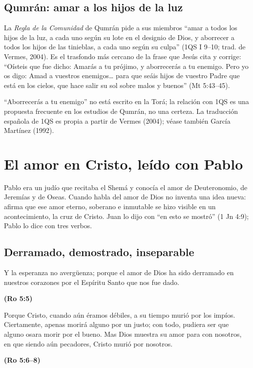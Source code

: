 \documentclass[11pt,letterpaper]{article}
\newcommand{\fuente}[1]{\par\hfill{\upshape\bfseries\small\textcolor{azul}{#1}}}
\begin{document}
\subsection{Qumrán: amar a los hijos de la luz}
La \emph{Regla de la Comunidad} de Qumrán pide a sus miembros ``amar a todos los hijos de la luz, a cada uno según su lote en el designio de Dios, y aborrecer a todos los hijos de las tinieblas, a cada uno según su culpa'' (1QS I 9--10; trad. de Vermes, 2004). Es el trasfondo más cercano de la frase que Jesús cita y corrige: ``Oísteis que fue dicho: Amarás a tu prójimo, y aborrecerás a tu enemigo. Pero yo os digo: Amad a vuestros enemigos\ldots{} para que seáis hijos de vuestro Padre que está en los cielos, que hace salir su sol sobre malos y buenos'' (Mt 5:43--45).

\begin{nota}[Precisión]
``Aborrecerás a tu enemigo'' no está escrito en la Torá; la relación con 1QS es una propuesta frecuente en los estudios de Qumrán, no una certeza. La traducción española de 1QS es propia a partir de Vermes (2004); véase también García Martínez (1992).
\end{nota}

\section{El amor en Cristo, leído con Pablo}\label{sec:cristo-amor}

Pablo era un judío que recitaba el Shemá y conocía el amor de Deuteronomio, de Jeremías y de Oseas. Cuando habla del amor de Dios no inventa una idea nueva: afirma que ese amor eterno, soberano e inmutable se hizo visible en un acontecimiento, la cruz de Cristo. Juan lo dijo con ``en esto se mostró'' (1 Jn 4:9); Pablo lo dice con tres verbos.

\subsection{Derramado, demostrado, inseparable}
\begin{cita}Y la esperanza no avergüenza; porque el amor de Dios ha sido derramado en nuestros corazones por el Espíritu Santo que nos fue dado.\fuente{(Ro 5:5)}\end{cita}

\begin{cita}Porque Cristo, cuando aún éramos débiles, a su tiempo murió por los impíos. Ciertamente, apenas morirá alguno por un justo; con todo, pudiera ser que alguno osara morir por el bueno. Mas Dios muestra su amor para con nosotros, en que siendo aún pecadores, Cristo murió por nosotros.\fuente{(Ro 5:6--8)}\end{cita}
\end{document}
